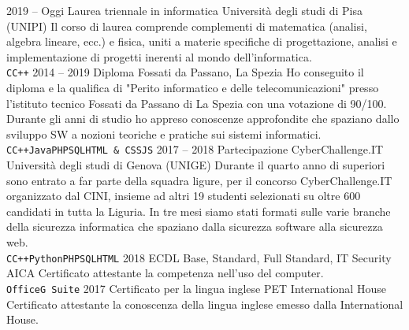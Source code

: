 \documentclass[9pt]{developercv} %
\begin{document}

\begin{entrylist}
	\entry
	{2019 -- Oggi}
	{Laurea triennale in informatica}
	{Università degli studi di Pisa (UNIPI)}
	{Il corso di laurea comprende complementi di matematica (analisi, algebra lineare, ecc.) e fisica, uniti a materie specifiche di progettazione, analisi e implementazione
		di progetti inerenti al mondo dell'informatica.\\
		\texttt{C}\slashsep\texttt{C++}}
	\entry
	{2014 -- 2019}
	{Diploma}
	{Fossati da Passano, La Spezia}
	{Ho conseguito il diploma e la qualifica di "Perito informatico e delle telecomunicazioni" presso l'istituto tecnico Fossati da Passano di La Spezia con una votazione di 90/100.
		Durante gli anni di studio ho appreso conoscenze approfondite che spaziano dallo sviluppo SW a nozioni teoriche e pratiche sui sistemi informatici.\\
		\texttt{C}\slashsep\texttt{C++}\slashsep\texttt{Java}\slashsep\texttt{PHP}\slashsep\texttt{SQL}\slashsep\texttt{HTML \& CSS}\slashsep\texttt{JS}}
	\entry
	{2017 -- 2018}
	{Partecipazione CyberChallenge.IT}
	{Università degli studi di Genova (UNIGE)}
	{Durante il quarto anno di superiori sono entrato a far parte della squadra ligure, per il concorso CyberChallenge.IT organizzato dal CINI, insieme ad altri 19 studenti selezionati su oltre
		600 candidati in tutta la Liguria. In tre mesi siamo stati formati sulle varie branche della sicurezza informatica che spaziano dalla sicurezza software alla sicurezza web.\\
		\texttt{C}\slashsep\texttt{C++}\slashsep\texttt{Python}\slashsep\texttt{PHP}\slashsep\texttt{SQL}\slashsep\texttt{HTML}}
	\entry
	{2018}
	{ECDL Base, Standard, Full Standard, IT Security}
	{AICA}
	{Certificato attestante la competenza nell'uso del computer.\\
		\texttt{Office}\slashsep\texttt{G Suite}}
	\entry
	{2017}
	{Certificato per la lingua inglese PET}
	{International House}
	{Certificato attestante la conoscenza della lingua inglese emesso dalla International House.}
\end{entrylist}

\end{document}
